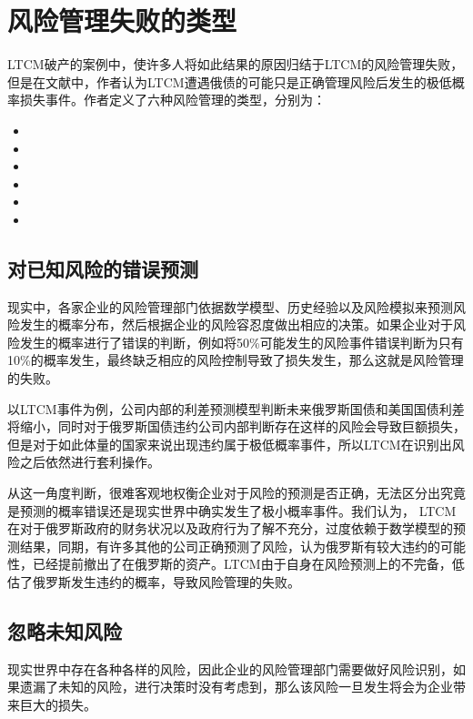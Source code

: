 \section{风险管理失败的类型}
LTCM破产的案例中，使许多人将如此结果的原因归结于LTCM的风险管理失败，但是在文献中，作者认为LTCM遭遇俄债的可能只是正确管理风险后发生的极低概率损失事件。作者定义了六种风险管理的类型，分别为：
\begin{itemize}
    \item {}
    \item {}
    \item {}
    \item {}
    \item {}
    \item {}
\end{itemize}
\subsection{对已知风险的错误预测}\label{sec:1}
现实中，各家企业的风险管理部门依据数学模型、历史经验以及风险模拟来预测风险发生的概率分布，然后根据企业的风险容忍度做出相应的决策。如果企业对于风险发生的概率进行了错误的判断，例如将50\%可能发生的风险事件错误判断为只有10\%的概率发生，最终缺乏相应的风险控制导致了损失发生，那么这就是风险管理的失败。

以LTCM事件为例，公司内部的利差预测模型判断未来俄罗斯国债和美国国债利差将缩小，同时对于俄罗斯国债违约公司内部判断存在这样的风险会导致巨额损失，但是对于如此体量的国家来说出现违约属于极低概率事件，所以LTCM在识别出风险之后依然进行套利操作。

从这一角度判断，很难客观地权衡企业对于风险的预测是否正确，无法区分出究竟是预测的概率错误还是现实世界中确实发生了极小概率事件。我们认为， LTCM在对于俄罗斯政府的财务状况以及政府行为了解不充分，过度依赖于数学模型的预测结果，同期，有许多其他的公司正确预测了风险，认为俄罗斯有较大违约的可能性，已经提前撤出了在俄罗斯的资产。LTCM由于自身在风险预测上的不完备，低估了俄罗斯发生违约的概率，导致风险管理的失败。

\subsection{忽略未知风险}\label{sec:2}
现实世界中存在各种各样的风险，因此企业的风险管理部门需要做好风险识别，如果遗漏了未知的风险，进行决策时没有考虑到，那么该风险一旦发生将会为企业带来巨大的损失。

